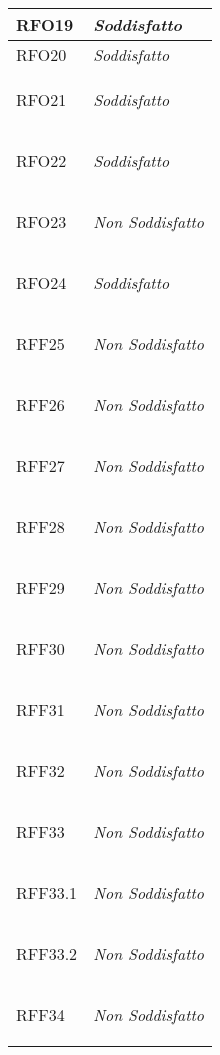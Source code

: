 \begin{longtable}{|>{\centering}m{5cm}|m{5cm}<{\centering}|}
    \hypertarget{RFO19}{RFO19} & \textit{Soddisfatto}\\ \hline
   
    \hypertarget{RFO20}{RFO20} & \textit{Soddisfatto}\\ \hline
   
    \hypertarget{RFO21}{RFO21} & \textit{Soddisfatto}\\ \hline
   
    \hypertarget{RFO22}{RFO22} & \textit{Soddisfatto}\\ \hline
   
    \hypertarget{RFO23}{RFO23} & \textit{Non Soddisfatto}\\ \hline
   
    \hypertarget{RFO24}{RFO24} & \textit{Soddisfatto}\\ \hline
   
    \hypertarget{RFF25}{RFF25} & \textit{Non Soddisfatto}\\ \hline
   
    \hypertarget{RFF26}{RFF26} & \textit{Non Soddisfatto}\\ \hline
   
    \hypertarget{RFF27}{RFF27} & \textit{Non Soddisfatto}\\ \hline
   
    \hypertarget{RFF28}{RFF28} & \textit{Non Soddisfatto}\\ \hline
   
    \hypertarget{RFF29}{RFF29} & \textit{Non Soddisfatto}\\ \hline
   
    \hypertarget{RFF30}{RFF30} & \textit{Non Soddisfatto}\\ \hline
   
    \hypertarget{RFF31}{RFF31} & \textit{Non Soddisfatto}\\ \hline
   
    \hypertarget{RFF32}{RFF32} & \textit{Non Soddisfatto}\\ \hline
   
    \hypertarget{RFF33}{RFF33} & \textit{Non Soddisfatto}\\ \hline
   
    \hypertarget{RFF33.1}{RFF33.1} & \textit{Non Soddisfatto}\\ \hline
   
    \hypertarget{RFF33.2}{RFF33.2} & \textit{Non Soddisfatto}\\ \hline
   
    \hypertarget{RFF34}{RFF34} & \textit{Non Soddisfatto}\\ \hline
   

\end{longtable}
